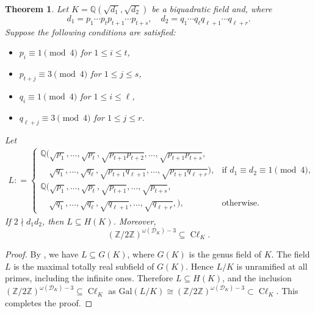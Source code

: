 \documentclass[12 pt]{amsart}
\newcommand\cD{{\mathcal{D}}}
\newcommand{\Z}{\mathbb{Z}}
\newcommand\Gal{{\mathrm {Gal}}}
\newtheorem{theorem}[thm]{Theorem}
\theoremstyle{definition}
\theoremstyle{remark}
\DeclareMathOperator{\Cl}{C\ell}
\begin{document}
	
	\begin{theorem} \label{part_Hilbert_classfield_for_biquadratic}
		Let $K = \mathbb{Q}(\sqrt{d_1}, \sqrt{d_2})$ be a biquadratic field and, where
		\[
		d_1 = p_1 \cdots p_t p_{t+1} \cdots p_{t+s}, \quad d_2 = q_1 \cdots q_\ell q_{\ell+1} \cdots q_{\ell+r}.
		\]
		Suppose  the following conditions are satisfied:
		\begin{itemize}
			\item $p_i \equiv 1 \pmod{4}$ for $1 \leq i \leq t$,
			\item $p_{t+j} \equiv 3 \pmod{4}$ for $1 \leq j \leq s$,
			\item $q_i \equiv 1 \pmod{4}$ for $1 \leq i \leq \ell$,
			\item $q_{\ell+j} \equiv 3 \pmod{4}$ for $1 \leq j \leq r$.
		\end{itemize}
		Let 
\begin{equation}\label{hilbertclassfld} 
\begin{aligned}
L: =
\begin{cases}
\mathbb{Q}\big( \sqrt{p_1}, \dots, \sqrt{p_t}, \sqrt{p_{t+1} p_{t+2}}, \dots, \sqrt{p_{t+1}p_{t+s}}, \\
\quad \sqrt{q_1}, \dots, \sqrt{q_\ell}, \sqrt{p_{t+1}q_{\ell+1}}, \dots, \sqrt{p_{t+1}q_{\ell+r}} \big), & \text{if } d_1 \equiv d_2 \equiv 1 \pmod{4}, \\[1ex]
\mathbb{Q}\big( \sqrt{p_1}, \dots, \sqrt{p_t}, \sqrt{p_{t+1}}, \dots, \sqrt{p_{t+s}}, \\
\quad \sqrt{q_1}, \dots, \sqrt{q_\ell}, \sqrt{q_{\ell+1}}, \dots, \sqrt{q_{\ell+r}},  \big), & \text{otherwise}.
\end{cases}
\end{aligned}
\end{equation}
If $2\nmid d_1d_2$, then $L \subseteq H(K)$. Moreover,
\[
(\Z/2\Z)^{\omega(\cD_K)-3} \subseteq \Cl_K.
\]
\end{theorem}

\begin{proof}
By , we have $L \subseteq G(K)$, where $G(K)$ is the genus field of $K$.  
The field $L$ is the maximal totally real subfield of $G(K)$.  
Hence $L/K$ is unramified at all primes, including the infinite ones.  
Therefore $L\subseteq H(K)$, and the inclusion 
$(\Z/2\Z)^{\omega(\cD_K)-3}\subseteq\Cl_K$  as $\Gal(L/K)\cong (\Z/2\Z)^{\omega(\cD_K)-3} \subset \Cl_K $.
This completes the proof. \qedhere
\end{proof}
\end{document}
